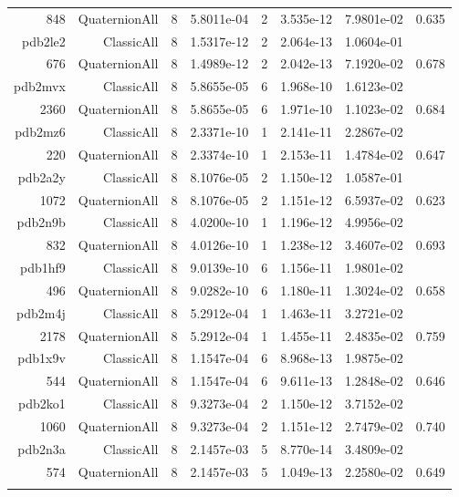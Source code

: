 \begin{xltabular}{\textwidth}{r|rcS[table-format=1.4e+2]cS[table-format=1.3e+2]S[table-format=1.4e+2]S[table-format=-1.3]}
848 & QuaternionAll & 8 & 5.8011e-04 & 2 & 3.535e-12 & 7.9801e-02 & 0.635\\  \addlinespace
pdb2le2 & ClassicAll & 8 & 1.5317e-12 & 2 & 2.064e-13 & 1.0604e-01 & \\
676 & QuaternionAll & 8 & 1.4989e-12 & 2 & 2.042e-13 & 7.1920e-02 & 0.678\\  \addlinespace
pdb2mvx & ClassicAll & 8 & 5.8655e-05 & 6 & 1.968e-10 & 1.6123e-02 & \\
2360 & QuaternionAll & 8 & 5.8655e-05 & 6 & 1.971e-10 & 1.1023e-02 & 0.684\\  \addlinespace
pdb2mz6 & ClassicAll & 8 & 2.3371e-10 & 1 & 2.141e-11 & 2.2867e-02 & \\
220 & QuaternionAll & 8 & 2.3374e-10 & 1 & 2.153e-11 & 1.4784e-02 & 0.647\\  \addlinespace
pdb2a2y & ClassicAll & 8 & 8.1076e-05 & 2 & 1.150e-12 & 1.0587e-01 & \\
1072 & QuaternionAll & 8 & 8.1076e-05 & 2 & 1.151e-12 & 6.5937e-02 & 0.623\\  \addlinespace
pdb2n9b & ClassicAll & 8 & 4.0200e-10 & 1 & 1.196e-12 & 4.9956e-02 & \\
832 & QuaternionAll & 8 & 4.0126e-10 & 1 & 1.238e-12 & 3.4607e-02 & 0.693\\  \addlinespace
pdb1hf9 & ClassicAll & 8 & 9.0139e-10 & 6 & 1.156e-11 & 1.9801e-02 & \\
496 & QuaternionAll & 8 & 9.0282e-10 & 6 & 1.180e-11 & 1.3024e-02 & 0.658\\  \addlinespace
pdb2m4j & ClassicAll & 8 & 5.2912e-04 & 1 & 1.463e-11 & 3.2721e-02 & \\
2178 & QuaternionAll & 8 & 5.2912e-04 & 1 & 1.455e-11 & 2.4835e-02 & 0.759\\  \addlinespace
pdb1x9v & ClassicAll & 8 & 1.1547e-04 & 6 & 8.968e-13 & 1.9875e-02 & \\
544 & QuaternionAll & 8 & 1.1547e-04 & 6 & 9.611e-13 & 1.2848e-02 & 0.646\\  \addlinespace
pdb2ko1 & ClassicAll & 8 & 9.3273e-04 & 2 & 1.150e-12 & 3.7152e-02 & \\
1060 & QuaternionAll & 8 & 9.3273e-04 & 2 & 1.151e-12 & 2.7479e-02 & 0.740\\  \addlinespace
pdb2n3a & ClassicAll & 8 & 2.1457e-03 & 5 & 8.770e-14 & 3.4809e-02 & \\
574 & QuaternionAll & 8 & 2.1457e-03 & 5 & 1.049e-13 & 2.2580e-02 & 0.649\\  \addlinespace
\end{xltabular}
